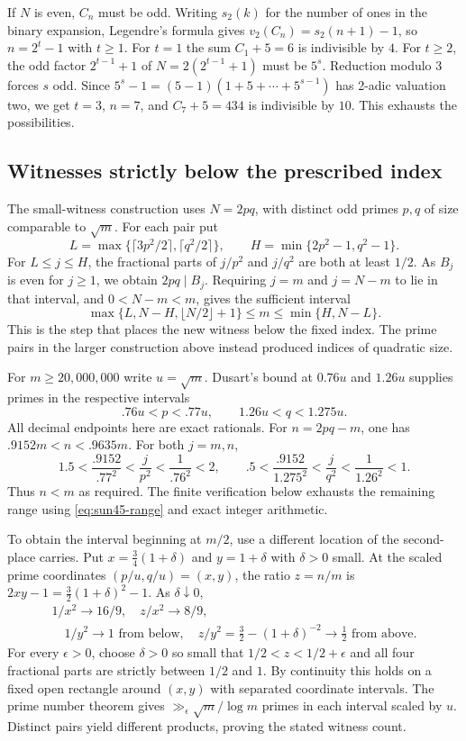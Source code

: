 \documentclass[11pt,a4paper]{article}
\numberwithin{equation}{section}
\begin{document}
If $N$ is even, $C_n$ must be odd. Writing $s_2(k)$ for the number
of ones in the binary expansion, Legendre's formula gives
$v_2(C_n)=s_2(n+1)-1$, so $n=2^t-1$ with $t\ge1$. For $t=1$ the
sum $C_1+5=6$ is indivisible by $4$. For $t\ge2$, the odd factor
$2^{t-1}+1$ of $N=2(2^{t-1}+1)$ must be $5^s$.
Reduction modulo $3$ forces $s$ odd. Since
$5^s-1=(5-1)(1+5+\cdots+5^{s-1})$ has 2-adic valuation two,
we get $t=3$, $n=7$, and $C_7+5=434$ is indivisible by $10$.
This exhausts the possibilities.

\subsection{Witnesses strictly below the prescribed index}

The small-witness construction uses $N=2pq$, with distinct odd primes
$p,q$ of size comparable to $\sqrt m$. For each pair put
\[
 L=\max\{\lceil 3p^2/2\rceil,\lceil q^2/2\rceil\},
 \qquad H=\min\{2p^2-1,q^2-1\}.
\]
For $L\le j\le H$, the fractional parts of $j/p^2$ and $j/q^2$
are both at least $1/2$. As $B_j$ is even for $j\ge1$, we obtain
$2pq\mid B_j$. Requiring $j=m$ and $j=N-m$ to lie in that interval,
and $0<N-m<m$, gives the sufficient interval
\begin{equation}
 \max\{L,N-H,\lfloor N/2\rfloor+1\}\le m\le\min\{H,N-L\}.
 \label{eq:sun45-range}
\end{equation}
This is the step that places the new witness below the fixed index.
The prime pairs in the larger construction above instead produced
indices of quadratic size.

For $m\ge20{,}000{,}000$ write $u=\sqrt m$. Dusart's bound at
$0.76u$ and $1.26u$ supplies primes in the respective intervals
\[
 .76u<p<.77u,\qquad 1.26u<q<1.275u.
\]
All decimal endpoints here are exact rationals. For $n=2pq-m$,
one has $.9152m<n<.9635m$. For both $j=m,n$,
\[
 1.5<\frac{.9152}{.77^2}
   <\frac{j}{p^2}<\frac{1}{.76^2}<2,\qquad
 .5<\frac{.9152}{1.275^2}
   <\frac{j}{q^2}<\frac{1}{1.26^2}<1 .
\]
Thus $n<m$ as required. The finite verification below exhausts the
remaining range using \eqref{eq:sun45-range} and exact integer arithmetic.

To obtain the interval beginning at $m/2$, use a different location
of the second-place carries. Put $x=\tfrac34(1+\delta)$ and
$y=1+\delta$ with $\delta>0$ small. At the scaled prime coordinates
$(p/u,q/u)=(x,y)$, the ratio $z=n/m$ is
$2xy-1=\tfrac32(1+\delta)^2-1$. As $\delta\downarrow0$,
\[
 \begin{gathered}1/x^2\longrightarrow16/9,\quad z/x^2\longrightarrow8/9,\\
 \quad 1/y^2\longrightarrow1\text{ from below},\quad
 z/y^2=\tfrac32-(1+\delta)^{-2}\longrightarrow\tfrac12
 \text{ from above}.\end{gathered}
\]
For every $\epsilon>0$, choose $\delta>0$ so small that
$1/2<z<1/2+\epsilon$ and all four fractional parts are strictly
between $1/2$ and $1$. By continuity this holds on a fixed open
rectangle around $(x,y)$ with separated coordinate intervals.
The prime number theorem gives $\gg_\epsilon\sqrt m/\log m$
primes in each interval scaled by $u$. Distinct pairs yield different
products, proving the stated witness count.
\end{document}
